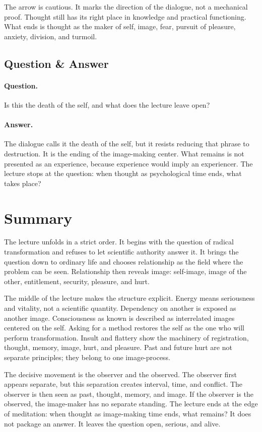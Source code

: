 The arrow is cautious. It marks the direction of the dialogue, not a mechanical proof. Thought still has its right place in knowledge and practical functioning. What ends is thought as the maker of self, image, fear, pursuit of pleasure, anxiety, division, and turmoil.

\subsection{Question \& Answer}

\paragraph{Question.}
Is this the death of the self, and what does the lecture leave open?

\paragraph{Answer.}
The dialogue calls it the death of the self, but it resists reducing that phrase to destruction. It is the ending of the image-making center. What remains is not presented as an experience, because experience would imply an experiencer. The lecture stops at the question: when thought as psychological time ends, what takes place?

\section{Summary}

The lecture unfolds in a strict order. It begins with the question of radical transformation and refuses to let scientific authority answer it. It brings the question down to ordinary life and chooses relationship as the field where the problem can be seen. Relationship then reveals image: self-image, image of the other, entitlement, security, pleasure, and hurt.

The middle of the lecture makes the structure explicit. Energy means seriousness and vitality, not a scientific quantity. Dependency on another is exposed as another image. Consciousness as known is described as interrelated images centered on the self. Asking for a method restores the self as the one who will perform transformation. Insult and flattery show the machinery of registration, thought, memory, image, hurt, and pleasure. Past and future hurt are not separate principles; they belong to one image-process.

The decisive movement is the observer and the observed. The observer first appears separate, but this separation creates interval, time, and conflict. The observer is then seen as past, thought, memory, and image. If the observer is the observed, the image-maker has no separate standing. The lecture ends at the edge of meditation: when thought as image-making time ends, what remains? It does not package an answer. It leaves the question open, serious, and alive.